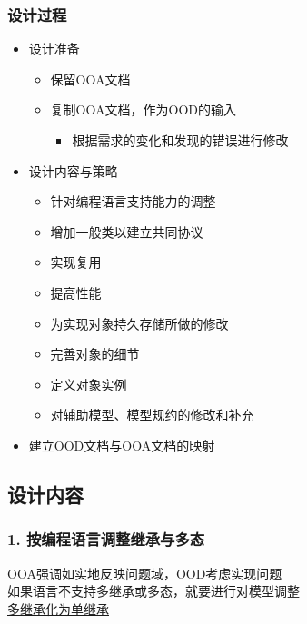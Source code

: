 \documentclass[compress]{beamer}
\begin{document}
\begin{frame}
\frametitle{设计过程}

 {
\begin{itemize}
\item 设计准备
\begin{itemize}
\item 保留OOA文档
\item 复制OOA文档，作为OOD的输入
\begin{itemize}
\item 根据需求的变化和发现的错误进行修改
\end{itemize}
\end{itemize}
\end{itemize}
}

 {
\begin{itemize}
\item 设计内容与策略
\begin{itemize}
\item 针对编程语言支持能力的调整 
\item 增加一般类以建立共同协议 
\item 实现复用
\item 提高性能 
\item 为实现对象持久存储所做的修改 
\item 完善对象的细节 
\item 定义对象实例 
\item 对辅助模型、模型规约的修改和补充
\end{itemize}
\item 建立OOD文档与OOA文档的映射
\end{itemize}
}

\end{frame}

\subsection{设计内容}

\begin{frame}
\frametitle{1. 按编程语言调整继承与多态}
OOA强调如实地反映问题域，OOD考虑实现问题 \\[2ex]
如果语言不支持多继承或多态，就要进行对模型调整 \\[2ex]
\quad \uline{多继承化为单继承}
\end{frame}
\end{document}
